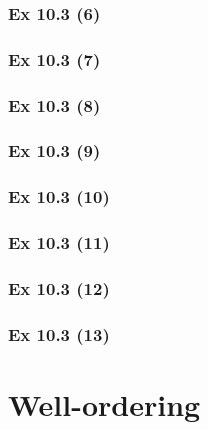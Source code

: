 \subsubsection{Ex 10.3 (6)}\label{sec:Ex_10.3.6}

\subsubsection{Ex 10.3 (7)}\label{sec:Ex_10.3.7}

\subsubsection{Ex 10.3 (8)}\label{sec:Ex_10.3.8}

\subsubsection{Ex 10.3 (9)}\label{sec:Ex_10.3.9}

\subsubsection{Ex 10.3 (10)}\label{sec:Ex_10.3.10}

\newpage		%

\subsubsection{Ex 10.3 (11)}\label{sec:Ex_10.3.11}

\subsubsection{Ex 10.3 (12)}\label{sec:Ex_10.3.12}

\subsubsection{Ex 10.3 (13)}\label{sec:Ex_10.3.13}

\newpage		%

\section{Well-ordering}\label{sec:10.4}

